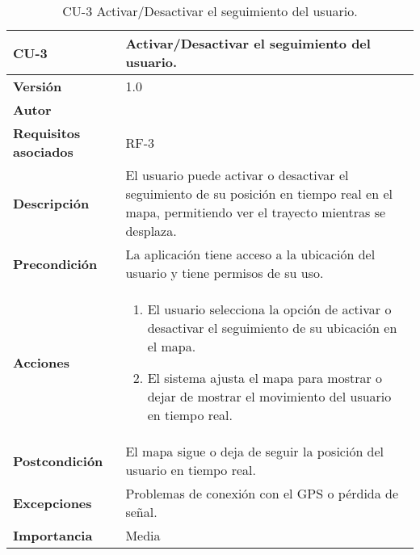 \begin{table}[p]
	\centering
	\begin{tabularx}{\linewidth}{ p{} p{} }
		\toprule
		\textbf{CU-3}    & \textbf{Activar/Desactivar el seguimiento del usuario.}\\
		\toprule
		\textbf{Versión}              & 1.0    \\
		\textbf{Autor}                & \autor \\
		\textbf{Requisitos asociados} & RF-3 \\
		\textbf{Descripción}          & El usuario puede activar o desactivar el seguimiento de su posición en tiempo real en el mapa, permitiendo ver el trayecto mientras se desplaza. \\
		\textbf{Precondición}         & La aplicación tiene acceso a la ubicación del usuario y tiene permisos de su uso. \\
		\textbf{Acciones}             &
		\begin{enumerate}
			\def\labelenumi{\arabic{enumi}.}
			\tightlist
			\item El usuario selecciona la opción de activar o desactivar el seguimiento de su ubicación en el mapa.
			\item El sistema ajusta el mapa para mostrar o dejar de mostrar el movimiento del usuario en tiempo real.
		\end{enumerate}\\
		\textbf{Postcondición}        & El mapa sigue o deja de seguir la posición del usuario en tiempo real. \\
		\textbf{Excepciones}          & Problemas de conexión con el GPS o pérdida de señal. \\
		\textbf{Importancia}          & Media  \\
		\bottomrule
	\end{tabularx}
	\caption{CU-3 Activar/Desactivar el seguimiento del usuario.}
\end{table}

